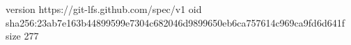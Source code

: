 version https://git-lfs.github.com/spec/v1
oid sha256:23ab7e163b44899599e7304c682046d9899650eb6ca757614c969ca9fd6d641f
size 277
